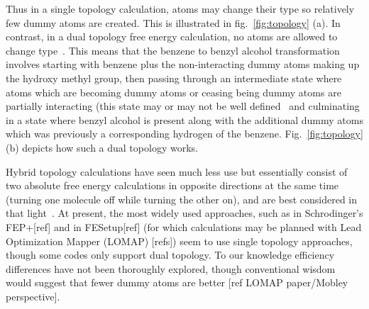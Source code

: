 \documentclass[9pt,bestpractices]{livecoms}
\begin{document}
Thus in a single topology calculation, atoms may change their type so relatively few dummy atoms are created. This is illustrated in fig.~\ref{fig:topology} (a). 
In contrast, in a dual topology free energy calculation, no atoms are allowed to change type~\cite{Shirts2012}. This means that the benzene to benzyl alcohol transformation involves starting with benzene plus the non-interacting dummy atoms making up the hydroxy methyl group, then passing through an intermediate state where atoms which are becoming dummy atoms or ceasing being dummy atoms are partially interacting (this state may or may not be well defined~\cite{Mobley:2014:J.Comput.AidedMol.Des.}  and culminating in a state where benzyl alcohol is present along with the additional dummy atoms which was previously a corresponding hydrogen of the benzene. Fig.~\ref{fig:topology} (b) depicts how such a dual topology works. 

Hybrid topology calculations have seen much less use but essentially consist of two absolute free energy calculations in opposite directions at the same time (turning one molecule off while turning the other on), and are best considered in that light~\cite{ [ref] }.
At present, the most widely used approaches, such as in Schrodinger's FEP+[ref] and in FESetup[ref] (for which calculations may be planned with Lead Optimization Mapper (LOMAP) [refs]) seem to use single topology approaches, though some codes only support dual topology.
To our knowledge efficiency differences have not been thoroughly explored, though conventional wisdom would suggest that fewer dummy atoms are better [ref LOMAP paper/Mobley perspective].
\end{document}
